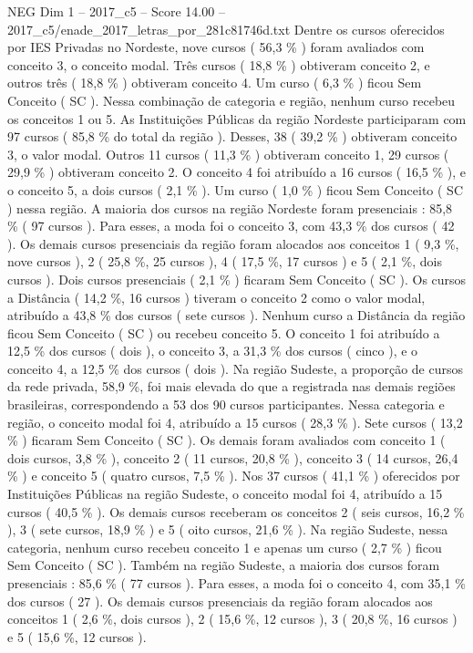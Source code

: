 \begin{textsample}{NEG Dim 1 – 2017\_c5 – Score 14.00 – 2017\_c5/enade\_2017\_letras\_por\_281c81746d.txt}
Dentre os cursos oferecidos por IES Privadas no Nordeste, nove cursos ( 56,3 \% ) foram avaliados com conceito 3, o conceito modal.
Três cursos ( 18,8 \% ) obtiveram conceito 2, e outros três ( 18,8 \% ) obtiveram conceito 4.
Um curso ( 6,3 \% ) ficou Sem Conceito ( SC ).
Nessa combinação de categoria e região, nenhum curso recebeu os conceitos 1 ou 5.
As Instituições Públicas da região Nordeste participaram com 97 cursos ( 85,8 \% do total da região ).
Desses, 38 ( 39,2 \% ) obtiveram conceito 3, o valor modal.
Outros 11 cursos ( 11,3 \% ) obtiveram conceito 1, 29 cursos ( 29,9 \% ) obtiveram conceito 2.
O conceito 4 foi atribuído a 16 cursos ( 16,5 \% ), e o conceito 5, a dois cursos ( 2,1 \% ).
Um curso ( 1,0 \% ) ficou Sem Conceito ( SC ) nessa região.
A maioria dos cursos na região Nordeste foram presenciais : 85,8 \% ( 97 cursos ).
Para esses, a moda foi o conceito 3, com 43,3 \% dos cursos ( 42 ).
Os demais cursos presenciais da região foram alocados aos conceitos 1 ( 9,3 \%, nove cursos ), 2 ( 25,8 \%, 25 cursos ), 4 ( 17,5 \%, 17 cursos ) e 5 ( 2,1 \%, dois cursos ).
Dois cursos presenciais ( 2,1 \% ) ficaram Sem Conceito ( SC ).
Os cursos a Distância ( 14,2 \%, 16 cursos ) tiveram o conceito 2 como o valor modal, atribuído a 43,8 \% dos cursos ( sete cursos ).
Nenhum curso a Distância da região ficou Sem Conceito ( SC ) ou recebeu conceito 5.
O conceito 1 foi atribuído a 12,5 \% dos cursos ( dois ), o conceito 3, a 31,3 \% dos cursos ( cinco ), e o conceito 4, a 12,5 \% dos cursos ( dois ).
Na região Sudeste, a proporção de cursos da rede privada, 58,9 \%, foi mais elevada do que a registrada nas demais regiões brasileiras, correspondendo a 53 dos 90 cursos participantes.
Nessa categoria e região, o conceito modal foi 4, atribuído a 15 cursos ( 28,3 \% ).
Sete cursos ( 13,2 \% ) ficaram Sem Conceito ( SC ).
Os demais foram avaliados com conceito 1 ( dois cursos, 3,8 \% ), conceito 2 ( 11 cursos, 20,8 \% ), conceito 3 ( 14 cursos, 26,4 \% ) e conceito 5 ( quatro cursos, 7,5 \% ).
Nos 37 cursos ( 41,1 \% ) oferecidos por Instituições Públicas na região Sudeste, o conceito modal foi 4, atribuído a 15 cursos ( 40,5 \% ).
Os demais cursos receberam os conceitos 2 ( seis cursos, 16,2 \% ), 3 ( sete cursos, 18,9 \% ) e 5 ( oito cursos, 21,6 \% ).
Na região Sudeste, nessa categoria, nenhum curso recebeu conceito 1 e apenas um curso ( 2,7 \% ) ficou Sem Conceito ( SC ).
Também na região Sudeste, a maioria dos cursos foram presenciais : 85,6 \% ( 77 cursos ).
Para esses, a moda foi o conceito 4, com 35,1 \% dos cursos ( 27 ).
Os demais cursos presenciais da região foram alocados aos conceitos 1 ( 2,6 \%, dois cursos ), 2 ( 15,6 \%, 12 cursos ), 3 ( 20,8 \%, 16 cursos ) e 5 ( 15,6 \%, 12 cursos ).

\end{textsample}
